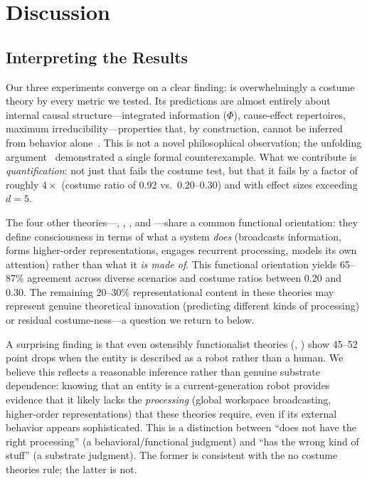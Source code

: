\section{Discussion}
\label{sec:discussion}

\subsection{Interpreting the Results}
\label{sec:interpretation}

Our three experiments converge on a clear finding: \IIT is overwhelmingly a costume theory by every metric we tested.
Its predictions are almost entirely about internal causal structure---integrated information ($\Phi$), cause-effect repertoires, maximum irreducibility---properties that, by construction, cannot be inferred from behavior alone~\citep{tononi2016iit}.
This is not a novel philosophical observation; the unfolding argument~\citep{doerig2019unfolding} demonstrated a single formal counterexample.
What we contribute is \emph{quantification}: not just that \IIT fails the costume test, but that it fails by a factor of roughly $4\times$ (costume ratio of 0.92 vs.\ 0.20--0.30) and with effect sizes exceeding $d = 5$.

The four other theories---\GNW, \HOT, \RPT, and \AST---share a common functional orientation: they define consciousness in terms of what a system \emph{does} (broadcasts information, forms higher-order representations, engages recurrent processing, models its own attention) rather than what it \emph{is made of}.
This functional orientation yields 65--87\% agreement across diverse scenarios and costume ratios between 0.20 and 0.30.
The remaining 20--30\% representational content in these theories may represent genuine theoretical innovation (predicting different kinds of processing) or residual costume-ness---a question we return to below.

A surprising finding is that even ostensibly functionalist theories (\GNW, \HOT) show 45--52 point drops when the entity is described as a robot rather than a human.
We believe this reflects a reasonable inference rather than genuine substrate dependence: knowing that an entity is a current-generation robot provides evidence that it likely lacks the \emph{processing} (global workspace broadcasting, higher-order representations) that these theories require, even if its external behavior appears sophisticated.
This is a distinction between ``does not have the right processing'' (a behavioral/functional judgment) and ``has the wrong kind of stuff'' (a substrate judgment).
The former is consistent with the no costume theories rule; the latter is not.

